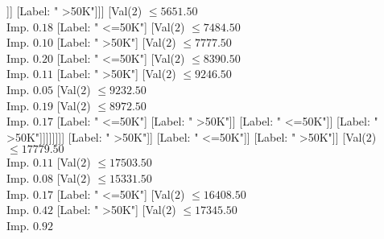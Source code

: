 \documentclass[margin=10pt]{standalone}
\begin{document}
\begin{forest}
									[Val($2$) $ \leq 11447.50$ \\ Imp. $0.03$
										[Val($2$) $ \leq 10984.50$ \\ Imp. $0.03$
											[Val($2$) $ \leq 9791.50$ \\ Imp. $0.03$
												[Val($2$) $ \leq 148.50$ \\ Imp. $0.02$
													[Label: " <=50K"]
													[Val($2$) $ \leq 4822.50$ \\ Imp. $0.03$
														[Val($2$) $ \leq 161.50$ \\ Imp. $0.03$
															[Label: " >50K"]
															[Val($2$) $ \leq 3172.50$ \\ Imp. $0.02$
																[Val($2$) $ \leq 571.50$ \\ Imp. $0.01$
																	[Label: " >50K"]
																	[Val($2$) $ \leq 1080.50$ \\ Imp. $0.03$
																		[Label: " <=50K"]
																		[Label: " >50K"]]]
																[Label: " >50K"]]]
														[Val($2$) $ \leq 5651.50$ \\ Imp. $0.18$
															[Label: " <=50K"]
															[Val($2$) $ \leq 7484.50$ \\ Imp. $0.10$
																[Label: " >50K"]
																[Val($2$) $ \leq 7777.50$ \\ Imp. $0.20$
																	[Label: " <=50K"]
																	[Val($2$) $ \leq 8390.50$ \\ Imp. $0.11$
																		[Label: " >50K"]
																		[Val($2$) $ \leq 9246.50$ \\ Imp. $0.05$
																			[Val($2$) $ \leq 9232.50$ \\ Imp. $0.19$
																				[Val($2$) $ \leq 8972.50$ \\ Imp. $0.17$
																					[Label: " <=50K"]
																					[Label: " >50K"]]
																				[Label: " <=50K"]]
																			[Label: " >50K"]]]]]]]]
												[Label: " >50K"]]
											[Label: " <=50K"]]
										[Label: " >50K"]]
									[Val($2$) $ \leq 17779.50$ \\ Imp. $0.11$
										[Val($2$) $ \leq 17503.50$ \\ Imp. $0.08$
											[Val($2$) $ \leq 15331.50$ \\ Imp. $0.17$
												[Label: " <=50K"]
												[Val($2$) $ \leq 16408.50$ \\ Imp. $0.42$
													[Label: " >50K"]
													[Val($2$) $ \leq 17345.50$ \\ Imp. $0.92$

\end{forest}
\end{document}
